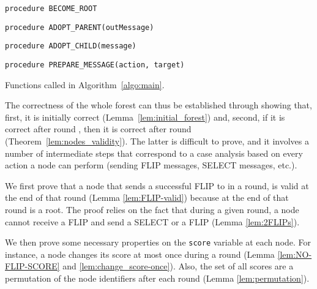 \documentclass[twocolumn]{article}
\begin{document}
\begin{algorithm2e}[h]









        \texttt{procedure BECOME\_ROOT}
  \bigskip

  \texttt{procedure ADOPT\_PARENT(outMessage)}
  \bigskip

  \texttt{procedure ADOPT\_CHILD(message)}
  \bigskip

  \texttt{procedure PREPARE\_MESSAGE(action, target)}
  \caption{Functions called in Algorithm~\ref{algo:main}.}
  \label{algo:functions}
\end{algorithm2e}

The correctness of the whole forest can thus be established through showing that, first, it is initially correct (Lemma~\ref{lem:initial_forest}) and, second, if it is correct after round , then it is correct after round  (Theorem~\ref{lem:nodes_validity}). The latter is difficult to prove, and it involves a number of intermediate steps that correspond to a case analysis based on every action a node can perform (sending FLIP messages, SELECT messages, etc.).

We first prove that a node  that sends a successful FLIP to 
in a round, is valid at the end of that round
(Lemma \ref{lem:FLIP-valid}) because at the end of that round  is a root.
The proof relies on the fact that during a given round, a node cannot receive a FLIP and send a SELECT or a FLIP
(Lemma  \ref{lem:2FLIPs}). 

We then prove some necessary properties on the {\tt score} variable at each node.
For instance, a node changes its score at most once during a round
(Lemma \ref{lem:NO-FLIP-SCORE} and \ref{lem:change_score-once}).
Also, the set of all scores are a permutation of the node identifiers after each round (Lemma \ref{lem:permutation}).
\end{document}
